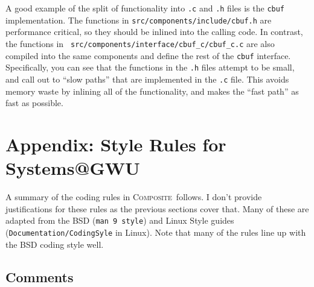 \documentclass[11pt,onecolumn]{article}
\def\composite{\textsc{Composite}}
\newcommand{\head}[1]{\vspace{0.4em}\noindent{\bf #1}}
\begin{document}
\head{Example.}  A good example of the split of functionality into
     {\tt .c} and {\tt .h} files is the {\tt cbuf} implementation.
     The functions in {\tt src/components/include/cbuf.h} are
     performance critical, so they should be inlined into the calling
     code.  In contrast, the functions in {\tt
       src/components/interface/cbuf\_c/cbuf\_c.c} are also compiled
     into the same components and define the rest of the {\tt cbuf}
     interface.  Specifically, you can see that the functions in the
     {\tt .h} files attempt to be small, and call out to ``slow
     paths'' that are implemented in the {\tt .c} file.  This avoids
     memory waste by inlining all of the functionality, and makes the
     ``fast path'' as fast as possible.





\newpage
\section{Appendix: Style Rules for Systems@GWU}
\label{s:appendix}

A summary of the coding rules in \composite\ follows.  I don't provide
justifications for these rules as the previous sections cover that.
Many of these are adapted from the BSD ({\tt man 9 style}) and Linux
Style guides ({\tt Documentation/CodingSyle} in Linux).  Note that
many of the rules line up with the BSD coding style well.

\subsection{Comments}
\end{document}
